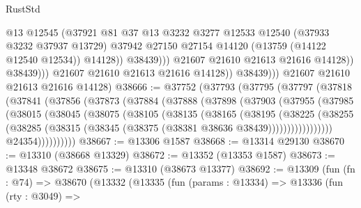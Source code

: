 \begin{lexlean}{RustStd}
\begin{coremodule}
                                  @13
                                  @12545
                                  (@37921
                                    @81
                                    @37
                                    @13
                                    @3232
                                    @3277
                                    @12533
                                    @12540
                                    (@37933 @3232 @37937 @13729)
                                    @37942
                                    @27150
                                    @27154
                                    @14120
                                    (@13759 (@14122 @12540 @12534))
                                    @14128))
                                @38439)))
                          @21607
                          @21610
                          @21613
                          @21616
                          @14128))
                      @38439)))
                @21607
                @21610
                @21613
                @21616
                @14128))
            @38439)))
      @21607
      @21610
      @21613
      @21616
      @14128)
@38666 := @37752
    (@37793
      (@37795
        (@37797
          (@37818
            (@37841
              (@37856
                (@37873
                  (@37884
                    (@37888
                      (@37898
                        (@37903
                          (@37955
                            (@37985
                              (@38015
                                (@38045
                                  (@38075
                                    (@38105
                                      (@38135
                                        (@38165
                                          (@38195
                                            (@38225
                                              (@38255
                                                (@38285
                                                  (@38315
                                                    (@38345
                                                      (@38375 (@38381 @38636 @38439)))))))))))))))))
                        @24354))))))))))
@38667 := @13306 @1587
@38668 := @13314 @29130
@38670 := @13310 (@38668 @13329)
@38672 := @13352 (@13353 @1587)
@38673 := @13348 @38672
@38675 := @13310 (@38673 @13377)
@38692 := @13309
    (fun (fn : @74) =>
    @38670
      (@13332
        (@13335
          (fun (params : @13334) =>
          @13336
            (fun (rty : @3049) =>

\end{coremodule}
\end{lexlean}
